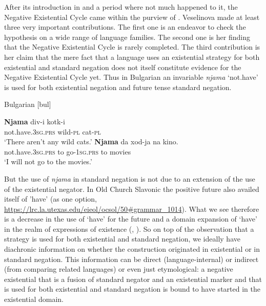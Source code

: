 ﻿\documentclass[output=paper]{langsci/langscibook}
\begin{document}
After its introduction in \citet{Croft1991} and a period where not much
happened to it, the Negative Existential Cycle came within the purview of
\textcites{Veselinova2010}{Veselinova2013}{Veselinova2014}{Veselinova2015}{Veselinova2016}. Veselinova made at least three
very important contributions. The first one is an endeavor to check the
hypothesis on a wide range of language families. The second one is her
finding that the Negative Existential Cycle is rarely completed. The third
contribution is her claim that the mere fact that a language uses an
existential strategy for both existential and standard negation does not
itself constitute evidence for the Negative Existential Cycle yet. Thus in
Bulgarian an invariable \textit{njama} `not.have' is used for both
existential negation and future tense standard negation.
%
\begin{exe}\ex\label{ex:int-bulgarian-cats-movies}
Bulgarian [bul] \parencites(Indo-European;)()[1333]{Veselinova2014}[204]{Veselinova2010}
\begin{xlist}
    \ex\gll \textbf{Njama}      div-i     kotk-i \\
not.have.\textsc{3sg.prs}  wild-\textsc{pl}   cat-\textsc{pl} \\
    \glt `There aren’t any wild cats.'
    \ex\gll \textbf{Njama}      da  xod-ja    na  kino.\\
not.have.\textsc{3sg.prs}  to  go-1\textsc{sg.prs}  to  movies\\
    \glt `I will not go to the movies.'
    \end{xlist}\end{exe}
%
But the use of \textit{njama} in standard negation is not due to an
extension of the use of the existential negator. In Old Church Slavonic the
positive future also availed itself of 'have' (as one option,
\href{https://lrc.la.utexas.edu/eieol/ocsol/50#grammar_1014}{https://lrc.la.utexas.edu/eieol/ocsol/50\#grammar\_1014})\nocite{OCS}. What we see
therefore is a decrease in the use of `have' for the future and a domain
expansion of `have' in the realm of expressions of existence
(\citealt[203--204]{Veselinova2010}, \cites(but compare )()[1336--1337]{Veselinova2014}
[157]{Veselinova2016}). So on top of the observation that a strategy is used
for both existential and standard negation, we ideally have diachronic
information on whether the construction originated in existential or in
standard negation. This information can be direct (language-internal) or
indirect (from comparing related languages) or even just etymological: a
negative existential that is a fusion of standard negator and an
existential marker and that is used for both existential and standard
negation is bound to have started in the existential domain.
\end{document}
